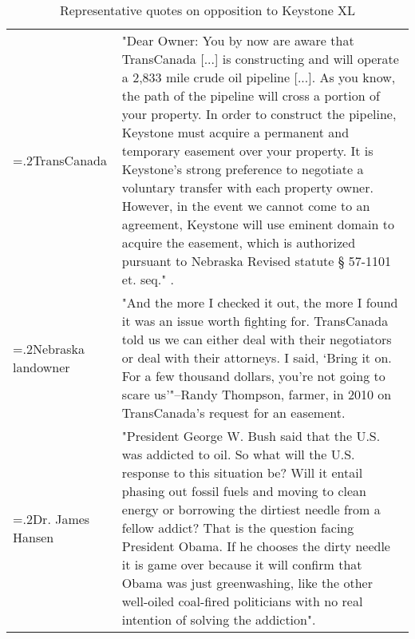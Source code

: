 \begin{table}[H]
	\caption{Representative quotes on opposition to Keystone XL}

	\begin{tabularx}{\linewidth}{>{\raggedright\hsize=.2\hsize}X X}
		\toprule

		TransCanada & "Dear Owner: You by now are aware that TransCanada [...] is constructing and will operate a 2,833 mile crude oil pipeline [...]. As you know, the path of the pipeline will cross a portion of your property. In order to construct the pipeline, Keystone must acquire a permanent and temporary easement over your property. It is Keystone's strong preference to negotiate a voluntary transfer with each property owner. However, in the event we cannot come to an agreement, Keystone will use eminent domain to acquire the easement, which is authorized pursuant to Nebraska Revised statute § 57-1101 et. seq." \citep{TransCanada2010}.\\

		Nebraska landowner & "And the more I checked it out, the more I found it was an issue worth fighting for. TransCanada told us we can either deal with their negotiators or deal with their attorneys. I said, ‘Bring it on. For a few thousand dollars, you’re not going to scare us’"--Randy Thompson, farmer, in 2010 on TransCanada's request for an easement.\parnote{\url{https://insideclimatenews.org/news/12102010/some-nebraska-landowners-wont-make-way-for-oil-sands-pipeline/}}\\

		Dr. James Hansen & "President George W. Bush said that the U.S. was addicted to oil. So what will the U.S. response to this situation be? Will it entail phasing out fossil fuels and moving to clean energy or borrowing the dirtiest needle from a fellow addict? That is the question facing President Obama. If he chooses the dirty needle it is game over because it will confirm that Obama was just greenwashing, like the other well-oiled coal-fired politicians with no real intention of solving the addiction".\parnote{\url{https://insideclimatenews.org/news/29082011/james-hansen-nasa-climate-change-scientist-keystone-xl-oil-sands-pipeline-protests-mckibben-white-house/}}\\

	\end{tabularx}
	\parnotes

\end{table}
